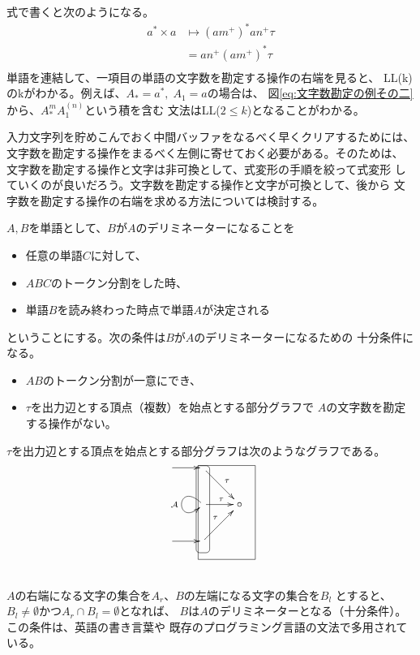 {\begin{equation}
\begin{split}
{		} \\
	\end{split}\end{equation}
	式で書くと次のようになる。
	\begin{equation*}\begin{split}
		a^*\times a &\mapsto (am^+)^*an^+\tau \\
		&= an^+(am^+)^*\tau \\
	\end{split}\end{equation*}
	単語を連結して、一項目の単語の文字数を勘定する操作の右端を見ると、
	LL(k)のkがわかる。例えば、$A_*=a^*,\;A_1=a$の場合は、
	図\eqref{eq:文字数勘定の例その二}から、$A_*^{m}A_1^{(n)}$という積を含む
	文法はLL($2\le k$)となることがわかる。

	\begin{todo}[中間バッファーの早期クリア]
	\label{todo:中間バッファーの早期クリア} %
		入力文字列を貯めこんでおく中間バッファをなるべく早くクリアするためには、
		文字数を勘定する操作をまるべく左側に寄せておく必要がある。そのためは、
		文字数を勘定する操作と文字は非可換として、式変形の手順を絞って式変形
		していくのが良いだろう。文字数を勘定する操作と文字が可換として、後から
		文字数を勘定する操作の右端を求める方法については検討する。

		$A,B$を単語として、$B$が$A$のデリミネーターになることを
		\begin{itemize}\setlength{\itemsep}{-1mm} %
			\item 任意の単語$C$に対して、
			\item $ABC$のトークン分割をした時、
			\item 単語$B$を読み終わった時点で単語$A$が決定される
		\end{itemize} %
		ということにする。次の条件は$B$が$A$のデリミネーターになるための
		十分条件になる。
		\begin{itemize}\setlength{\itemsep}{-1mm} %
			\item $AB$のトークン分割が一意にでき、
			\item $\tau$を出力辺とする頂点（複数）を始点とする部分グラフで
			$A$の文字数を勘定する操作がない。
		\end{itemize} %
		$\tau$を出力辺とする頂点を始点とする部分グラフは次のようなグラフである。
		\begin{equation*}\xymatrix{
			\ar[r] & \ar[rd]^\tau \\
			&  \ar@(ul,dl)_{\mycal{A}} \ar[r]^\tau & \circ \\
			\ar[r] & \ar[ru]^\tau & \\
			\save "1,2"."3,2" *+[F-:<3pt>]\frm{} \restore
			\save "1,2"."3,3" *++[F]\frm{} \restore
		}\end{equation*}
		$A$の右端になる文字の集合を$A_r$、$B$の左端になる文字の集合を$B_l$
		とすると、$B_l\neq\emptyset$かつ$A_r\cap B_l=\emptyset$となれば、
		$B$は$A$のデリミネーターとなる（十分条件）。この条件は、英語の書き言葉や
		既存のプログラミング言語の文法で多用されている。
	\end{todo} %

}
